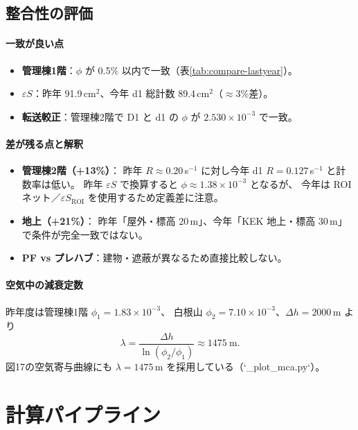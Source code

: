 \documentclass[a4paper,11pt]{ltjsarticle}
\begin{document}
\subsection{整合性の評価}

\paragraph{一致が良い点}
\begin{itemize}
  \item \textbf{管理棟1階}：$\phi$ が 0.5\% 以内で一致（表\ref{tab:compare-lastyear}）。
  \item \textbf{$\varepsilon S$}：昨年 91.9\,cm$^2$、今年 d1 総計数 89.4\,cm$^2$（$\approx$3\%差）。
  \item \textbf{転送較正}：管理棟2階で D1 と d1 の $\phi$ が $2.530\times10^{-3}$ で一致。
\end{itemize}

\paragraph{差が残る点と解釈}
\begin{itemize}
  \item \textbf{管理棟2階（+13\%）}：
    昨年 $R\approx0.20$\,s$^{-1}$ に対し今年 d1 $R=0.127$\,s$^{-1}$ と計数率は低い。
    昨年 $\varepsilon S$ で換算すると $\phi\approx1.38\times10^{-3}$ となるが、
    今年は ROI ネット／$\varepsilon S_\mathrm{ROI}$ を使用するため定義差に注意。
  \item \textbf{地上（+21\%）}：
    昨年「屋外・標高 20\,m」、今年「KEK 地上・標高 30\,m」で条件が完全一致ではない。
  \item \textbf{PF vs プレハブ}：建物・遮蔽が異なるため直接比較しない。
\end{itemize}

\paragraph{空気中の減衰定数}
昨年度は管理棟1階 $\phi_1=1.83\times10^{-3}$、
白根山 $\phi_2=7.10\times10^{-3}$、$\Delta h=2000$\,m より
\begin{equation}
  \lambda = \frac{\Delta h}{\ln(\phi_2/\phi_1)} \approx 1475\ \mathrm{m}.
\end{equation}
図17の空気寄与曲線にも $\lambda=1475$\,m を採用している（`_plot\_mca.py`）。

\section{計算パイプライン}
\end{document}
